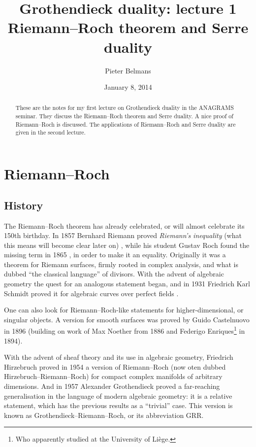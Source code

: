 \documentclass[10pt,a4paper]{article}
\title{Grothendieck duality: lecture 1 \\[.2em] \Large Riemann--Roch theorem and Serre duality}
\author{Pieter Belmans}
\date{January 8, 2014}
\begin{document}
\maketitle

\begin{abstract}
  These are the notes for my first lecture on Grothendieck duality in the ANAGRAMS seminar. They discuss the Riemann--Roch theorem and Serre duality. A nice proof of Riemann--Roch is discussed. The applications of Riemann--Roch and Serre duality are given in the second lecture.
\end{abstract}

\tableofcontents

\clearpage

\section{Riemann--Roch}
\label{section:riemann-roch}
\subsection{History}
\label{subsection:riemann-roch-history}
The Riemann--Roch theorem has already celebrated, or will almost celebrate its 150th birthday. In 1857 Bernhard Riemann proved \emph{Riemann's inequality} (what this means will become clear later on) \cite{riemann-abelschen-funktionen}, while his student Gustav Roch found the missing term in 1865 \cite{roch-ueber-die-anzahl}, in order to make it an equality. Originally it was a theorem for Riemann surfaces, firmly rooted in complex analysis, and what is dubbed ``the classical language'' of divisors. With the advent of algebraic geometry the quest for an analogous statement began, and in 1931 Friedrich Karl Schmidt proved it for algebraic curves over perfect fields \cite{schmidt-zaehlentheorie}.

One can also look for Riemann--Roch-like statements for higher-dimensional, or singular objects. A version for smooth surfaces was proved by Guido Castelnuovo in 1896 (building on work of Max Noether from 1886 and Federigo Enriques\footnote{Who apparently studied at the University of Li\`ege.} in 1894). 

With the advent of sheaf theory and its use in algebraic geometry, Friedrich Hirzebruch proved in 1954 a version of Riemann--Roch (now oten dubbed Hirzebruch--Riemann--Roch) for compact complex manifolds of arbitrary dimensions. And in 1957 Alexander Grothendieck proved a far-reaching generalisation in the language of modern algebraic geometry: it is a relative statement, which has the previous results as a ``trivial'' case. This version is known as Grothendieck--Riemann--Roch, or its abbreviation GRR.
\end{document}
